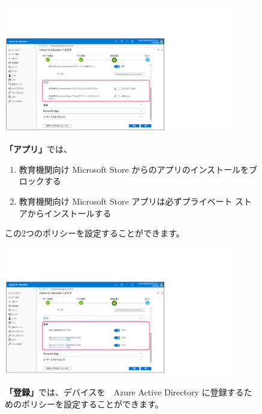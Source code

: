 \begin{figure}[h]
    \begin{minipage}{0.6\textwidth}
        \vspace{-1cm}
        \includegraphics[width=10cm]{figures/Setup-Intune-09.png}
    \end{minipage}
    \begin{minipage}{0.4\textwidth}
       \textbf{「アプリ」}では、
       \begin{enumerate}
           \item 教育機関向け Microsoft Store からのアプリのインストールをブロックする
           \item 教育機関向け Microsoft Store アプリは必ずプライベート ストアからインストールする
       \end{enumerate}
       この2つのポリシーを設定することができます。
    \end{minipage}
\end{figure}

\begin{figure}[h]
    \begin{minipage}{0.6\textwidth}
        \vspace{-1cm}
        \includegraphics[width=10cm]{figures/Setup-Intune-10.png}
    \end{minipage}
    \begin{minipage}{0.4\textwidth}
        \textbf{「登録」}では、デバイスを　Azure Active Directory に登録するためのポリシーを設定することができます。
    \end{minipage}
\end{figure}

